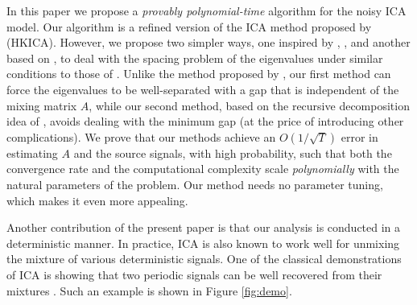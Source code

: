 \documentclass[jmlr]{article}
\theoremstyle{definition}
\begin{document}
In this paper we propose a \emph{provably polynomial-time} algorithm for the noisy ICA model.
Our algorithm is a refined version of the ICA method proposed by \cite{hsu2013learning} (HKICA). 
However, we propose two simpler ways, one inspired by \citet{frieze1996learning}, \citet{arora2012provable}, and another based on \citet{vempala2014max}, to deal with the spacing problem of the eigenvalues under similar conditions to those of \citet{goyal2014fourier}.
Unlike the method proposed by \citet{goyal2014fourier}, our first method can force the eigenvalues to be well-separated with a gap that is independent of the mixing matrix $A$, while our second method, based on the recursive decomposition idea of \citet{vempala2014max}, avoids dealing with the minimum gap (at the price of introducing other complications).
We prove that our methods achieve an $O(1/\sqrt{T})$ error in estimating $A$ and the source signals, with high probability, such that both the convergence rate and the computational complexity scale \emph{polynomially} with the natural parameters of the problem. %
Our method needs no parameter tuning, which makes it even more appealing. %


Another contribution of the present paper is that our analysis is conducted in a deterministic manner. 
In practice, ICA is also known to work well for unmixing the mixture of various deterministic signals. 
One of the classical demonstrations of ICA is showing that two periodic signals can be well recovered from their mixtures \citep{HyvOja00}.
Such an example is shown in Figure \ref{fig:demo}. 
\end{document}
